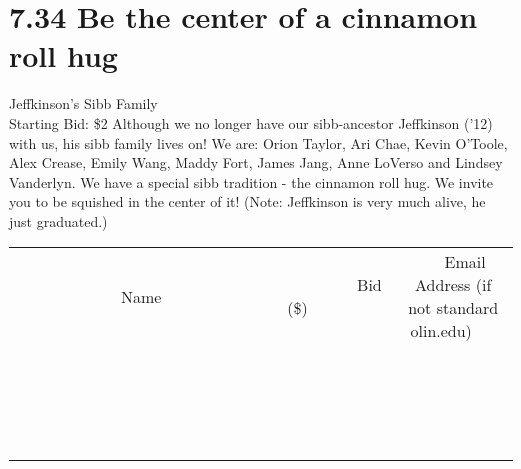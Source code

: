 \documentclass[11pt]{article}
\begin{document}
\section*{7.34 Be the center of a cinnamon roll hug}
Jeffkinson's Sibb Family
\\
Starting Bid: \$2
\newline
Although we no longer have our sibb-ancestor Jeffkinson ('12) with us, his sibb family lives on! We are: Orion Taylor, Ari Chae, Kevin O'Toole, Alex Crease, Emily Wang, Maddy Fort, James Jang, Anne LoVerso and Lindsey Vanderlyn. We have a special sibb tradition - the cinnamon roll hug. We invite you to be squished in the center of it! (Note: Jeffkinson is very much alive, he just graduated.)
\\[3ex]
\begin{tabular}{c c c}
~~~~~~~~~~~~~Name~~~~~~~~~~~~~ & ~~~~~~~~~Bid (\$)~~~~~~~~~  & ~~~Email Address (if not standard olin.edu)~~~\\
 & & \\
\hline
 & & \\
\hline
 & & \\
\hline
 & & \\
\hline
 & & \\
\hline
 & & \\
\hline
 & & \\
\hline
 & & \\
\hline
 & & \\
\hline
 & & \\
\hline
 & & \\
\hline
 & & \\
\hline
 & & \\
\hline
 & & \\
\hline
 & & \\
\hline
 & & \\
\hline
 & & \\
\hline
 & & \\
\hline
 & & \\
\hline
\end{tabular}
\newpage
\end{document}
